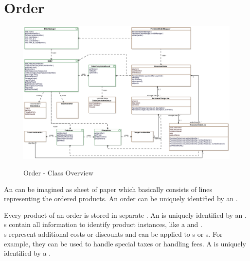 \newpage
\section{Order}
\label{sec:order}

\begin{figure}
	\centering
  \includegraphics[width=1.0\textwidth]{images/Order_Overview.eps}
	\label{order_overview}
	\caption{Order - Class Overview}
\end{figure}

An  can be imagined as sheet of paper which basically consists of lines representing the ordered products.
An order can be uniquely identified by an .

Every product of an order is stored in separate .
An  is uniquely identified by an .
s contain all information to identify product instances, like a  and .
\\

s represent additional costs or discounts and can be applied to s or s. 
For example, they can be used to handle special taxes or handling fees.
A  is uniquely identified by a .
\\

